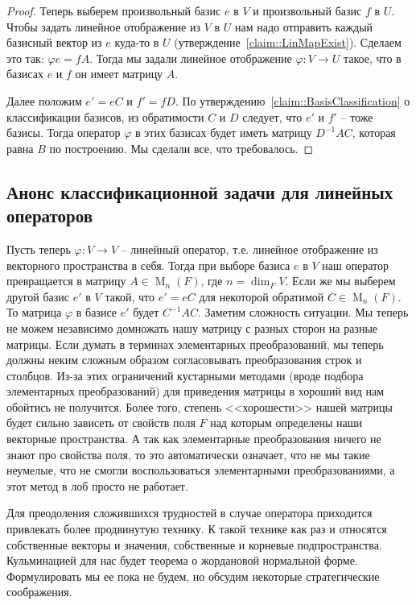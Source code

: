 \begin{proof}
Теперь выберем произвольный базис $e$ в $V$ и произвольный базис $f$ в $U$. Чтобы задать линейное отображение из $V$ в $U$ нам надо отправить каждый базисный вектор из $e$ куда-то в $U$ (утверждение~\ref{claim::LinMapExist}). Сделаем это так: $\varphi e = f A$. Тогда мы задали линейное отображение $\varphi \colon V\to U$ такое, что в базисах $e$ и $f$ он имеет матрицу $A$. 

Далее положим $e' = eC$ и $f' = fD$. По утверждению~\ref{claim::BasisClassification} о классификации базисов, из обратимости $C$ и $D$ следует, что $e'$ и $f'$ -- тоже базисы. Тогда оператор $\varphi$ в этих базисах будет иметь матрицу $D^{-1}AC$, которая равна $B$ по построению. Мы сделали все, что требовалось.
\end{proof}


\subsection{Анонс классификационной задачи для линейных операторов}

Пусть теперь $\varphi\colon V\to V$ -- линейный оператор, т.е. линейное отображение из векторного пространства в себя. Тогда при выборе базиса $e$ в $V$ наш оператор превращается в матрицу $A\in \operatorname{M}_n(F)$, где $n = \dim_F V$. Если же мы выберем другой базис $e'$ в $V$ такой, что $e' = eC$ для некоторой обратимой $C \in \operatorname{M}_n(F)$. То матрица $\varphi$ в базисе $e'$ будет $C^{-1}AC$. Заметим сложность ситуации. Мы теперь не можем независимо домножать нашу матрицу с разных сторон на разные матрицы. Если думать в терминах элементарных преобразований, мы теперь должны неким сложным образом согласовывать преобразования строк и столбцов. Из-за этих ограничений кустарными методами (вроде подбора элементарных преобразований) для приведения матрицы в хороший вид нам обойтись не получится. Более того, степень <<хорошести>> нашей матрицы будет сильно зависеть от свойств поля $F$ над которым определены наши векторные пространства. А так как элементарные преобразования ничего не знают про свойства поля, то это автоматически означает, что не мы такие неумелые, что не смогли воспользоваться элементарными преобразованиями, а этот метод в лоб просто не работает.

Для преодоления сложившихся трудностей в случае оператора приходится привлекать более продвинутую технику. К такой технике как раз и относятся собственные векторы и значения, собственные и корневые подпространства. Кульминацией для нас будет теорема о жордановой нормальной форме. Формулировать мы ее пока не будем, но обсудим некоторые стратегические соображения.

